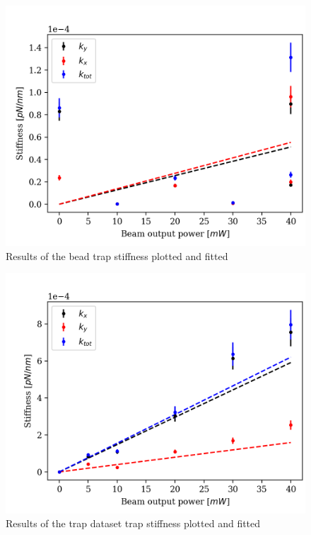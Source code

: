 \begin{minipage}{\linewidth}
    \centering
    \begin{minipage}[l]{0.45\linewidth}
        \begin{figure}[H]
            \centering
            \includegraphics[width=\linewidth]{figures/beam.png}
            \caption{Results of the bead trap stiffness plotted and fitted}
            \label{fig:bead-plot}
        \end{figure}
    \end{minipage}
    \hspace{0.05\linewidth}
    \begin{minipage}[r]{0.45\linewidth}
        \begin{figure}[H]
            \centering
            \includegraphics[width=\linewidth]{figures/trap.png}
            \caption{Results of the trap dataset trap stiffness plotted and fitted}
            \label{fig:trap-plot}
        \end{figure}
    \end{minipage}

\end{minipage}
